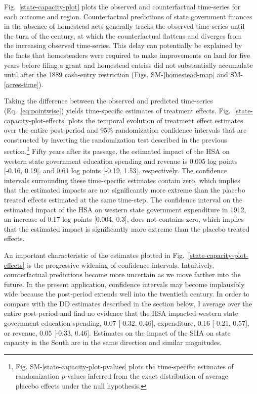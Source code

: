 \documentclass[12pt]{article}
\begin{document}
Fig.~\ref{state-capacity-plot} plots the observed and counterfactual time-series for each outcome and region. Counterfactual predictions of state government finances in the absence of homestead acts generally tracks the observed time-series until the turn of the century, at which the counterfactual flattens and diverges from the increasing observed time-series. This delay can potentially be explained by the facts that homesteaders were required to make improvements on land for five years before filing a grant and homestead entries did not substantially accumulate until after the 1889 cash-entry restriction (Figs. SM-\ref{homestead-map} and SM-\ref{acres-time}). 

Taking the difference between the observed and predicted time-series (Eq.~\ref{eq:pointwise}) yields time-specific estimates of treatment effects. Fig.~\ref{state-capacity-plot-effects} plots the temporal evolution of treatment effect estimates over the entire post-period and 95\% randomization confidence intervals that are constructed by inverting the randomization test described in the previous section.\footnote{Fig. SM-\ref{state-capacity-plot-pvalues} plots the time-specific estimates of randomization $p$-values inferred from the exact distribution of average placebo effects under the null hypothesis.} Fifty years after its passage, the estimated impact of the HSA on western state government education spending and revenue is 0.005 log points [-0.16, 0.19], and 0.61 log points [-0.19, 1.53], respectively. The confidence intervals surrounding these time-specific estimates contain zero, which implies that the estimated impacts are not significantly more extreme than the placebo treated effects estimated at the same time-step. The confidence interval on the estimated impact of the HSA on western state government expenditure in 1912, an increase of 0.17 log points [0.004, 0.3], does not contains zero, which implies that the estimated impact is significantly more extreme than the placebo treated effects. 

An important characteristic of the estimates plotted in Fig.~\ref{state-capacity-plot-effects} is the progressive widening of confidence intervals. Intuitively, counterfactual predictions become more uncertain as we move farther into the future. In the present application, confidence intervals may become implausibly wide because the post-period extends well into the twentieth century. In order to compare with the DD estimates described in the section below, I average over the entire post-period and find no evidence that the HSA impacted western state government education spending, 0.07 [-0.32, 0.46], expenditure, 0.16 [-0.21, 0.57], or revenue, 0.05 [-0.33, 0.46]. Estimates on the impact of the SHA on state capacity in the South are in the same direction and similar magnitudes. 
\end{document}
